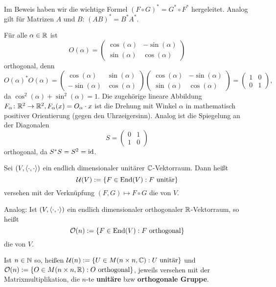\begin{bemerkung}
	\label{bem:6.3}
	Im Beweis haben wir die wichtige Formel $(F \circ G)^* = G^* \circ F^*$ hergeleitet.
	Analog gilt für Matrizen $A$ und $B$: $(AB)^* = B^* A^*$.
\end{bemerkung}

\begin{beispiel}
	\label{bsp:6.4}
	Für alle $\alpha \in \mathbb{R}$ ist
	\[
		O(\alpha) = \begin{pmatrix}
			\cos(\alpha) & -\sin(\alpha) \\
			\sin(\alpha) & \cos(\alpha)
		\end{pmatrix}
	\]
	orthogonal, denn
	\[
		O(\alpha)^* O(\alpha) = \begin{pmatrix}
			\cos(\alpha)  & \sin(\alpha) \\
			-\sin(\alpha) & \cos(\alpha)
		\end{pmatrix} \begin{pmatrix}
		\cos(\alpha) & -\sin(\alpha) \\
		\sin(\alpha) & \cos(\alpha)
		\end{pmatrix} = \begin{pmatrix}
			1 & 0 \\
			0 & 1
		\end{pmatrix},
	\]
	da $\cos^2(\alpha) + \sin^2(\alpha) = 1$.
	Die zugehörige lineare Abbildung $F_\alpha \colon \mathbb{R}^2 \rightarrow \mathbb{R}^2, F_\alpha(x) = O_\alpha \cdot x$ ist die Drehung mit Winkel $\alpha$ in mathematisch positiver Orientierung (gegen den Uhrzeigersinn).
	Analog ist die Spiegelung an der Diagonalen
	\[
		S = \begin{pmatrix}
		 0 & 1 \\
		 1 & 0
		\end{pmatrix}
	\]
	orthogonal, da $S^*S = S^2 = \operatorname{id}$.
\end{beispiel}

\begin{definition}
	\label{def:6.5}
	Sei $(V,\left\langle\cdot,\cdot\right\rangle)$ ein endlich dimensionaler unitärer $\mathbb{C}$-Vektorraum.
	Dann heißt
	\[
		\mathcal{U}(V) := \{F \in \operatorname{End}(V) : F \text{ unitär}\}
	\]
	versehen mit der Verknüpfung $(F,G) \mapsto F \circ G$ die  von $V$.
	
	Analog: Ist $(V,\left\langle\cdot,\cdot\right\rangle)$ ein endlich dimensionaler orthogonaler $\mathbb{R}$-Vektorraum, so heißt
	\[
		\mathcal{O}(n) := \{F \in \operatorname{End}(V) : F \text{ orthogonal}\}
	\]
	die  von $V$.
	
	Ist $n \in \mathbb{N}$ so, heißen $\mathcal{U}(n) := \{U \in M(n\times n,\mathbb{C}) : U \text{ unitär}\}$ und $\mathcal{O}(n) := \{O \in M(n \times n,\mathbb{R}) : O \text{ orthogonal}\}$, jeweils versehen mit der Matrixmultiplikation, die $n$-te \textbf{unitäre} bzw \textbf{orthogonale Gruppe}.
\end{definition}


